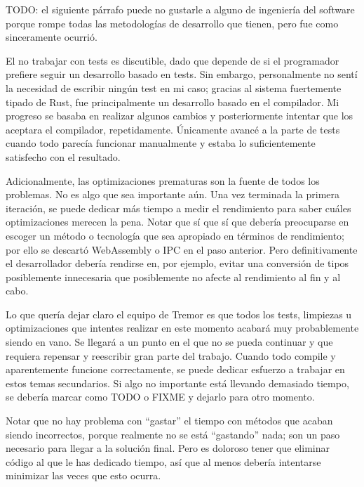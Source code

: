 TODO: el siguiente párrafo puede no gustarle a alguno de ingeniería del software
porque rompe todas las metodologías de desarrollo que tienen, pero fue como
sinceramente ocurrió.

El no trabajar con tests es discutible, dado que depende de si el programador
prefiere seguir un desarrollo basado en tests. Sin embargo, personalmente no
sentí la necesidad de escribir ningún test en mi caso; gracias al sistema
fuertemente tipado de Rust, fue principalmente un desarrollo basado en el
compilador. Mi progreso se basaba en realizar algunos cambios y posteriormente
intentar que los aceptara el compilador, repetidamente. Únicamente avancé a la
parte de tests cuando todo parecía funcionar manualmente y estaba lo
suficientemente satisfecho con el resultado.

Adicionalmente, las optimizaciones prematuras son la fuente de todos los
problemas. No es algo que sea importante aún. Una vez terminada la primera
iteración, se puede dedicar más tiempo a medir el rendimiento para saber cuáles
optimizaciones merecen la pena. Notar que sí que sí que debería preocuparse en
escoger un método o tecnología que sea apropiado en términos de rendimiento; por
ello se descartó WebAssembly o IPC en el paso anterior. Pero definitivamente el
desarrollador debería rendirse en, por ejemplo, evitar una conversión de tipos
posiblemente innecesaria que posiblemente no afecte al rendimiento al fin y al
cabo.

Lo que quería dejar claro el equipo de Tremor es que todos los tests, limpiezas
u optimizaciones que intentes realizar en este momento acabará muy probablemente
siendo en vano. Se llegará a un punto en el que no se pueda continuar y que
requiera repensar y reescribir gran parte del trabajo. Cuando todo compile y
aparentemente funcione correctamente, se puede dedicar esfuerzo a trabajar en
estos temas secundarios. Si algo no importante está llevando demasiado tiempo,
se debería marcar como TODO o FIXME y dejarlo para otro momento.

Notar que no hay problema con ``gastar'' el tiempo con métodos que acaban siendo
incorrectos, porque realmente no se está ``gastando'' nada; son un paso
necesario para llegar a la solución final. Pero es doloroso tener que eliminar
código al que le has dedicado tiempo, así que al menos debería intentarse
minimizar las veces que esto ocurra.

\section{\abistable}

